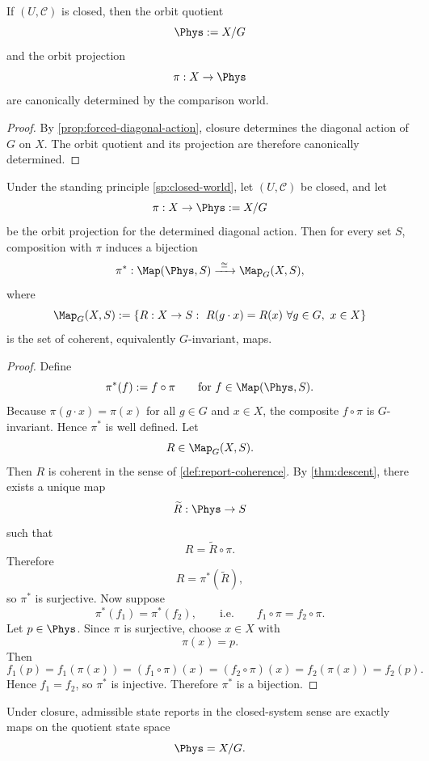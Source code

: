 \begin{corollary}
	\label{cor:closure-terminal-data}
	If \((U,\mathcal C)\) is closed, then the orbit quotient
	\[
		\Phys:=X/G
	\]
	and the orbit projection
	\[
		\pi:X\to\Phys
	\]
	are canonically determined by the comparison world.
\end{corollary}
\begin{proof}
	By \cref{prop:forced-diagonal-action}, closure determines the diagonal
	action of \(G\) on \(X\). The orbit quotient and its projection are
	therefore canonically determined.
\end{proof}
\begin{proposition}
	\label{prop:principal}
	Under the standing principle \cref{sp:closed-world}, let
	\((U,\mathcal C)\) be closed, and let
	\[
		\pi:X\to \Phys:=X/G
	\]
	be the orbit projection for the determined diagonal action. Then for every
	set \(S\), composition with \(\pi\) induces a bijection
	\[
		\pi^*:\Map(\Phys,S)\xrightarrow{\ \cong\ }\Map_G(X,S),
	\]
	where
	\[
		\Map_G(X,S)
		:=
		\{R:X\to S:\ R(g\cdot x)=R(x)\ \forall g\in G,\ x\in X\}
	\]
	is the set of coherent, equivalently \(G\)-invariant, maps.
\end{proposition}
\begin{proof}
	Define
	\[
		\pi^*(f):=f\circ\pi
		\qquad
		\text{for }f\in\Map(\Phys,S).
	\]
	Because \(\pi(g\cdot x)=\pi(x)\) for all \(g\in G\) and \(x\in X\), the
	composite \(f\circ\pi\) is \(G\)-invariant. Hence \(\pi^*\) is well
	defined.
	Let
	\[
		R\in\Map_G(X,S).
	\]
	Then \(R\) is coherent in the sense of \cref{def:report-coherence}. By
	\cref{thm:descent}, there exists a unique map
	\[
		\widetilde R:\Phys\to S
	\]
	such that
	\[
		R=\widetilde R\circ\pi.
	\]
	Therefore
	\[
		R=\pi^*(\widetilde R),
	\]
	so \(\pi^*\) is surjective.
	Now suppose
	\[
		\pi^*(f_1)=\pi^*(f_2),
		\qquad\text{i.e.}\qquad
		f_1\circ\pi=f_2\circ\pi.
	\]
	Let \(p\in\Phys\). Since \(\pi\) is surjective, choose \(x\in X\) with
	\[
		\pi(x)=p.
	\]
	Then
	\[
		f_1(p)
		=
		f_1(\pi(x))
		=
		(f_1\circ\pi)(x)
		=
		(f_2\circ\pi)(x)
		=
		f_2(\pi(x))
		=
		f_2(p).
	\]
	Hence \(f_1=f_2\), so \(\pi^*\) is injective. Therefore \(\pi^*\) is a
	bijection.
\end{proof}
\begin{corollary}
	\label{cor:closed-equals-quotient}
	Under closure, admissible state reports in the closed-system sense are
	exactly maps on the quotient state space
	\[
		\Phys=X/G.
	\]
\end{corollary}
